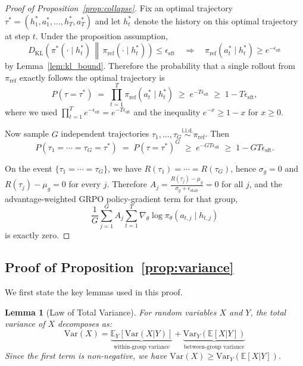 \documentclass{article}
\theoremstyle{plain}
\newtheorem{lemma}[theorem]{Lemma}
\theoremstyle{definition}
\theoremstyle{remark}
\begin{document}
\begin{proof}[Proof of Proposition~\ref{prop:collapse}]
Fix an optimal trajectory $\tau^*=(h_1^*,a_1^*,\dots,h_T^*,a_T^*)$ and let $h_t^*$ denote the history on this optimal trajectory at step $t$. Under the proposition assumption,
\begin{equation}
D_{\mathrm{KL}}\!\left(\pi^*(\cdot\mid h_t^*)\,\middle\|\,\pi_{\mathrm{ref}}(\cdot\mid h_t^*)\right)\le \epsilon_{\text{sft}}
\quad\Rightarrow\quad
\pi_{\mathrm{ref}}(a_t^*\mid h_t^*) \ge e^{-\epsilon_{\text{sft}}}
\end{equation}
by Lemma~\ref{lem:kl_bound}. Therefore the probability that a single rollout from $\pi_{\mathrm{ref}}$ exactly follows the optimal trajectory is
\begin{equation}
P(\tau=\tau^*) \;=\; \prod_{t=1}^{T}\pi_{\mathrm{ref}}(a_t^*\mid h_t^*) \;\ge\; e^{-T\epsilon_{\text{sft}}} \;\ge\; 1-T\epsilon_{\text{sft}},
\end{equation}
where we used $\prod_{t=1}^T e^{-\epsilon_{\text{sft}}}=e^{-T\epsilon_{\text{sft}}}$ and the inequality $e^{-x}\ge 1-x$ for $x\ge 0$.

Now sample $G$ independent trajectories $\tau_1,\dots,\tau_G \overset{\text{i.i.d.}}{\sim}\pi_{\mathrm{ref}}$. Then
\begin{equation}
P(\tau_1=\cdots=\tau_G=\tau^*) \;=\; P(\tau=\tau^*)^G \;\ge\; e^{-GT\epsilon_{\text{sft}}} \;\ge\; 1-GT\epsilon_{\text{sft}}.
\end{equation}

On the event $\{\tau_1=\cdots=\tau_G\}$, we have $R(\tau_1)=\cdots=R(\tau_G)$, hence $\sigma_g=0$ and $R(\tau_j)-\mu_g=0$ for every $j$. Therefore $A_j=\frac{R(\tau_j)-\mu_g}{\sigma_g+\epsilon_{\text{stab}}}=0$ for all $j$, and the advantage-weighted GRPO policy-gradient term for that group,
\begin{equation}
\frac{1}{G}\sum_{j=1}^G A_j \sum_{t=1}^{T}\nabla_\theta \log \pi_\theta(a_{t,j}\mid h_{t,j})
\end{equation}
is exactly zero.
\end{proof}

\subsection{Proof of Proposition~\ref{prop:variance}}

We first state the key lemmas used in this proof.

\begin{lemma}[Law of Total Variance]
\label{lem:total_variance}
For random variables $X$ and $Y$, the total variance of $X$ decomposes as:
\begin{equation}
\text{Var}(X) = \underbrace{\mathbb{E}_{Y}[\text{Var}(X|Y)]}_{\text{within-group variance}} + \underbrace{\text{Var}_{Y}(\mathbb{E}[X|Y])}_{\text{between-group variance}}
\end{equation}
Since the first term is non-negative, we have $\text{Var}(X) \ge \text{Var}_{Y}(\mathbb{E}[X|Y])$.
\end{lemma}
\end{document}
